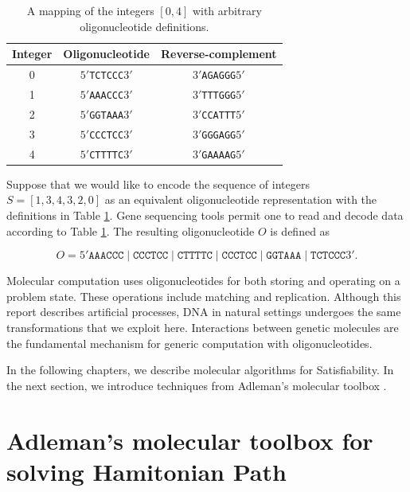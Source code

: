 \begin{table}[htdp]
\caption{A mapping of the integers $[0,4]$ with arbitrary oligonucleotide definitions.}
\begin{center}
\begin{tabular}{|c|c|c|}
\hline
 \textbf{Integer} & \textbf{Oligonucleotide} & \textbf{Reverse-complement}\\ \hline
0 & $5'$\texttt{TCTCCC}$3'$ & $3'$\texttt{AGAGGG}$5'$ \\
1 & $5'$\texttt{AAACCC}$3'$ & $3'$\texttt{TTTGGG}$5'$ \\
2 & $5'$\texttt{GGTAAA}$3'$ & $3'$\texttt{CCATTT}$5'$ \\
3 & $5'$\texttt{CCCTCC}$3'$ & $3'$\texttt{GGGAGG}$5'$ \\
4 & $5'$\texttt{CTTTTC}$3'$ & $3'$\texttt{GAAAAG}$5'$ \\ \hline
\end{tabular}
\end{center}
\label{integer2OligoTable}
\end{table}%

Suppose that we would like to encode the sequence of integers $S = [1, 3, 4, 3, 2, 0]$ as an equivalent oligonucleotide representation with the definitions in Table \ref{integer2OligoTable}.  Gene sequencing tools permit one to read and decode data according to Table \ref{integer2OligoTable}.  The resulting oligonucleotide $O$ is defined as

\[
O = 5'\texttt{AAACCC}\mid \texttt{CCCTCC}\mid \texttt{CTTTTC}\mid \texttt{CCCTCC}\mid \texttt{GGTAAA}\mid \texttt{TCTCCC}3'.
\]

Molecular computation uses oligonucleotides for both storing and operating on a problem state.  These operations include matching and replication.  Although this report describes artificial processes, DNA in natural settings undergoes the same transformations that we exploit here.  Interactions between genetic molecules are the fundamental mechanism for generic computation with oligonucleotides.
	
In the following chapters, we describe molecular algorithms for {\sc Satisfiability}.  In the next section, we introduce techniques from Adleman's molecular toolbox \cite{Adleman:1994:MCS:189441.189442}.

\section{Adleman's molecular toolbox for solving {\sc Hamitonian Path}}
	

